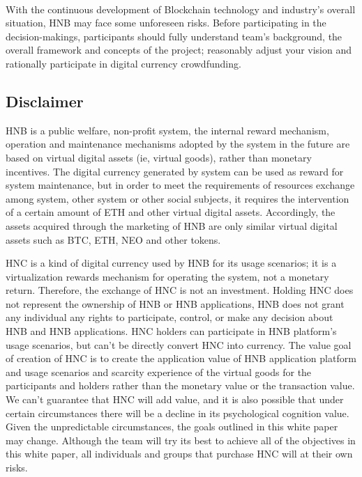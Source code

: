 \documentclass[fleqn,10pt]{SelfArx} %
\begin{document}
\\
With the continuous development of Blockchain technology and industry's overall situation, HNB may face some unforeseen risks. Before participating in the decision-makings, participants should fully understand team's background, the overall framework and concepts of the project; reasonably adjust your vision and rationally participate in digital currency crowdfunding.

\subsection{Disclaimer}

HNB is a public welfare, non-profit system, the internal reward mechanism, operation and maintenance mechanisms adopted by the system in the future are based on virtual digital assets (ie, virtual goods), rather than monetary incentives. The digital currency generated by system can be used as reward for system maintenance, but in order to meet the requirements of resources exchange among system, other system or other social subjects, it requires the intervention of a certain amount of ETH and other virtual digital assets. Accordingly, the assets acquired through the marketing of HNB are only similar virtual digital assets such as BTC, ETH, NEO and other tokens.

HNC is a kind of digital currency used by HNB for its usage scenarios; it is a virtualization rewards mechanism for operating the system, not a monetary return. Therefore, the exchange of HNC is not an investment. Holding HNC does not represent the ownership of HNB or HNB applications, HNB does not grant any individual any rights to participate, control, or make any decision about HNB and HNB applications. HNC holders can participate in HNB platform's usage scenarios, but can’t be directly convert HNC into currency. The value goal of creation of HNC is to create the application value of HNB application platform and usage scenarios and scarcity experience of the virtual goods for the participants and holders rather than the monetary value or the transaction value. We can’t guarantee that HNC will add value, and it is also possible that under certain circumstances there will be a decline in its psychological cognition value. Given the unpredictable circumstances, the goals outlined in this white paper may change. Although the team will try its best to achieve all of the objectives in this white paper, all individuals and groups that purchase HNC will at their own risks.
\end{document}
